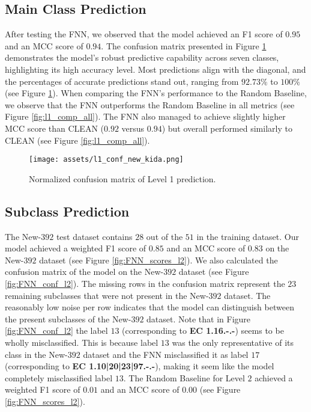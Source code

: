 \documentclass{bioinfo}
\begin{document}

\subsection{Main Class Prediction}
After testing the FNN, we observed that the model achieved an F1 score of $0.95$ and an MCC score of $0.94$. 
The confusion matrix presented in Figure \ref{fig:FNN_conf_l1} demonstrates the model's robust predictive capability across seven classes, 
highlighting its high accuracy level. Most predictions align with the diagonal, and the percentages of accurate predictions stand out, 
ranging from $92.73\%$ to $100\%$ (see Figure \ref{fig:FNN_conf_l1}).
When comparing the FNN's performance to the Random Baseline, we observe that the FNN outperforms the Random Baseline in all metrics (see Figure \ref{fig:l1_comp_all}).
The FNN also managed to achieve slightly higher MCC score than CLEAN ($0.92$ versus $0.94$) but overall performed similarly to CLEAN (see Figure \ref{fig:l1_comp_all}).

\begin{figure}[!ht]
\texttt{[image: assets/l1\_conf\_new\_kida.png]}
\caption{Normalized confusion matrix of Level 1 prediction.}\label{fig:FNN_conf_l1}
\end{figure}

\subsection{Subclass Prediction}
The New-$392$ test dataset contains $28$ out of the $51$ in the training dataset.
Our model achieved a weighted F1 score of $0.85$ and an MCC score of $0.83$ on the New-$392$ dataset (see Figure \ref{fig:FNN_scores_l2}).
We also calculated the confusion matrix of the model on the New-$392$ dataset (see Figure \ref{fig:FNN_conf_l2}).
The missing rows in the confusion matrix represent the $23$ remaining subclasses that were not present in the New-$392$ dataset.
The reasonably low noise per row indicates that the model can distinguish between the present subclasses of the New-$392$ dataset.
Note that in Figure \ref{fig:FNN_conf_l2} the label $13$ (corresponding to \textbf{EC 1.16.-.-}) seems to be wholly misclassified.
This is because label $13$ was the only representative of its class in the New-$392$ dataset and
the FNN misclassified it as label $17$ (corresponding to \textbf{EC 1.10|20|23|97.-.-}), making it seem like the model completely misclassified label $13$.
The Random Baseline for Level $2$ achieved a weighted F1 score of $0.01$ and an MCC score of $0.00$ (see Figure \ref{fig:FNN_scores_l2}).
\end{document}
